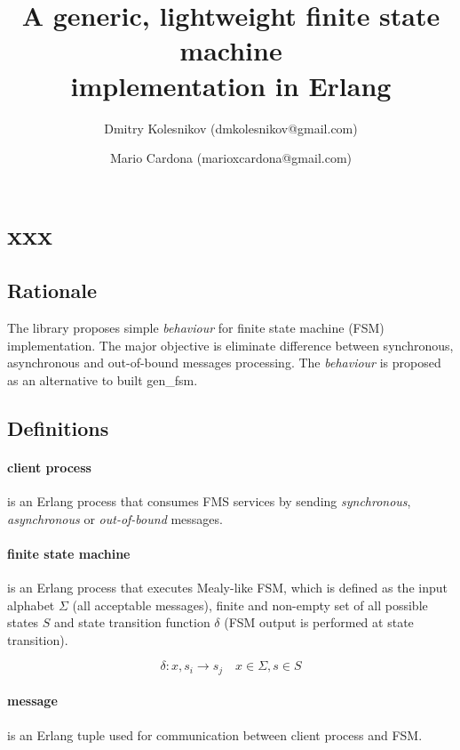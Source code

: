 \documentclass{report}
\begin{document}
\title{A generic, lightweight finite state machine \\ implementation in Erlang}
\author{
   Dmitry Kolesnikov (dmkolesnikov@gmail.com) \and 
   Mario Cardona (marioxcardona@gmail.com)
}
\maketitle

\chapter{xxx}

\section{Rationale}
   The library proposes simple \emph{behaviour} for finite state machine (FSM) 
   implementation. The major objective is eliminate difference between synchronous,
   asynchronous and out-of-bound messages processing. The \emph{behaviour} is 
   proposed as an alternative to built gen\_fsm. 
  
\section{Definitions}

\subsubsection{client process}
   is an Erlang process that consumes FMS services by sending \emph{synchronous}, 
   \emph{asynchronous} or \emph{out-of-bound} messages.
   
\subsubsection{finite state machine}
	is an Erlang process that executes Mealy-like FSM, which is defined as 
	the input alphabet $\Sigma$ (all acceptable messages), finite and non-empty
	set of all possible states $S$ and state transition function $\delta$ 
	(FSM output is performed at state transition).
	
	$$ \delta: x,s_i \longrightarrow s_j \quad x \in \Sigma, s \in S $$ 

\subsubsection{message}
	is an Erlang tuple used for communication between client process and FSM. 
\end{document}
